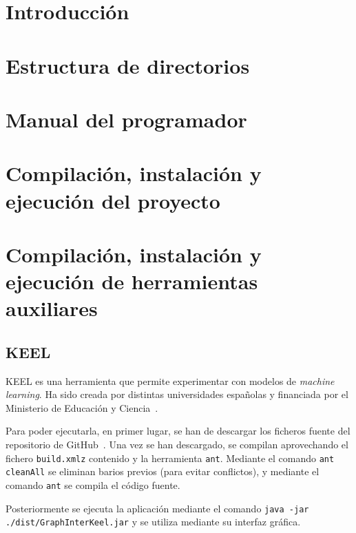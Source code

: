 
\section{Introducción}

\section{Estructura de directorios}

\section{Manual del programador}

\section{Compilación, instalación y ejecución del proyecto}

\section{Compilación, instalación y ejecución de herramientas auxiliares}

\subsection{KEEL}

KEEL es una herramienta que permite experimentar con modelos de \textit{machine learning}. Ha sido creada por distintas universidades españolas y financiada por el Ministerio de Educación y Ciencia~\cite{KEEL}.

Para poder ejecutarla, en primer lugar, se han de descargar los ficheros fuente del repositorio de GitHub~\cite{keelRepo}. Una vez se han descargado, se compilan aprovechando el fichero \texttt{build.xmlz} contenido y la herramienta \texttt{ant}. Mediante el comando \texttt{ant cleanAll} se eliminan barios previos (para evitar conflictos), y mediante el comando \texttt{ant} se compila el código fuente.

Posteriormente se ejecuta la aplicación mediante el comando \texttt{java -jar ./dist/GraphInterKeel.jar} y se utiliza mediante su interfaz gráfica.


